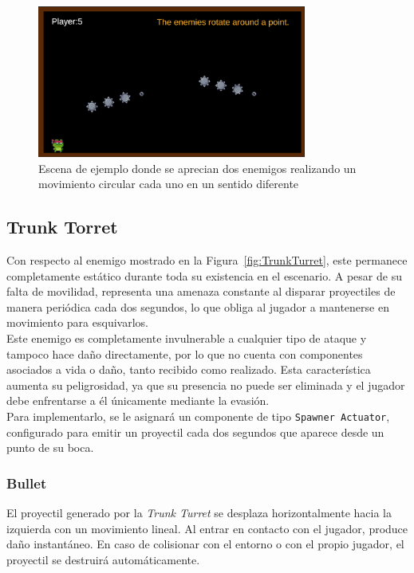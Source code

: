 \begin{figure}[t]
	\centering
	\includegraphics[height=5cm]{Imagenes/SpinningRocks.png}
	\caption{Escena de ejemplo donde se aprecian dos enemigos realizando un movimiento circular cada uno en un sentido diferente}
	\label{fig:SpinningRocks}
\end{figure}

\subsection{Trunk Torret}

Con respecto al enemigo mostrado en la Figura~\ref{fig:TrunkTurret}, este permanece completamente estático durante toda su existencia en el escenario. A pesar de su falta de movilidad, representa una amenaza constante al disparar proyectiles de manera periódica cada dos segundos, lo que obliga al jugador a mantenerse en movimiento para esquivarlos.\\

Este enemigo es completamente invulnerable  a cualquier tipo de ataque y tampoco hace daño directamente, por lo que no cuenta con componentes asociados a vida o daño, tanto recibido como realizado. Esta característica aumenta su peligrosidad, ya que su presencia no puede ser eliminada y el jugador debe enfrentarse a él únicamente mediante la evasión.\\

Para implementarlo, se le asignará un componente de tipo \texttt{Spawner Actuator}, configurado para emitir un proyectil cada dos segundos que aparece desde un punto de su boca.
\subsubsection{Bullet}

El proyectil generado por la \textit{Trunk Turret} se desplaza horizontalmente hacia la izquierda con un movimiento lineal. Al entrar en contacto con el jugador, produce daño instantáneo. En caso de colisionar con el entorno o con el propio jugador, el proyectil se destruirá automáticamente.\\

